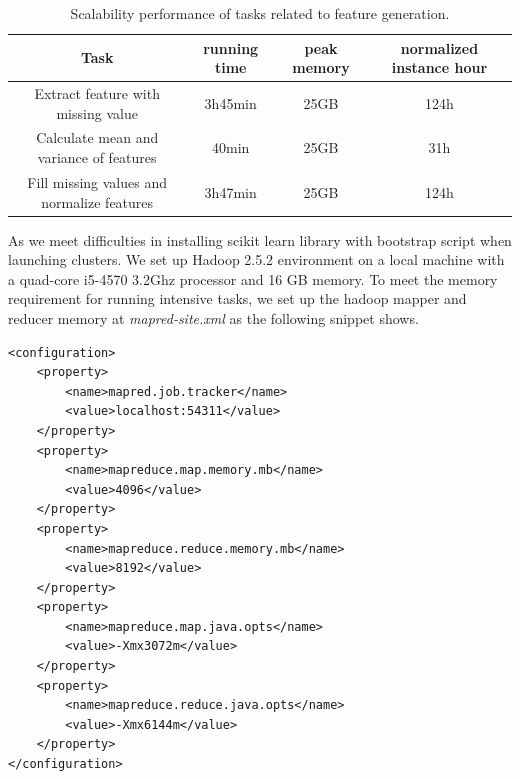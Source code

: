 \begin{table}[H]
    \begin{tabular}{| c | c | c | c |}
    \hline
    Task & running time & peak memory & normalized instance hour \\
    \hline
    \hline
    Extract feature with missing value & 3h45min & 25GB & 124h\\
    \hline
    Calculate mean and variance of features & 40min & 25GB & 31h\\
    \hline
    Fill missing values and normalize features & 3h47min & 25GB & 124h\\
    \hline
    \end{tabular}
    \caption{Scalability performance of tasks related to feature generation.}
    \label{tbl:PerfTable}
\end{table}

As we meet difficulties in installing scikit learn library with bootstrap script when launching clusters. We set up Hadoop 2.5.2 environment on a local machine with a quad-core i5-4570 3.2Ghz processor and 16 GB memory. To meet the memory requirement for running intensive tasks, we set up the hadoop mapper and reducer memory at \textit{mapred-site.xml } as the following snippet shows.

\begin{lstlisting}
<configuration>
    <property>
        <name>mapred.job.tracker</name>
        <value>localhost:54311</value>
    </property>
    <property>
        <name>mapreduce.map.memory.mb</name>
        <value>4096</value>
    </property>
    <property>
        <name>mapreduce.reduce.memory.mb</name>
        <value>8192</value>
    </property>
    <property>
        <name>mapreduce.map.java.opts</name>
        <value>-Xmx3072m</value>
    </property>
    <property>
        <name>mapreduce.reduce.java.opts</name>
        <value>-Xmx6144m</value>
    </property>
</configuration>

\end{lstlisting}

